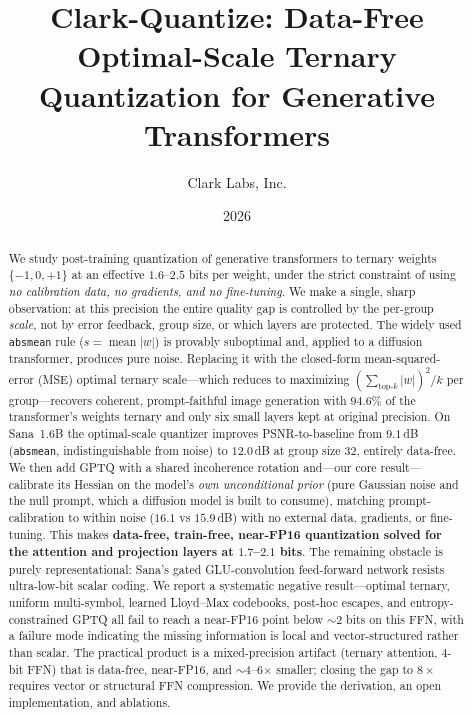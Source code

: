 \documentclass[11pt]{article}
\title{\textbf{Clark-Quantize: Data-Free Optimal-Scale Ternary\\
Quantization for Generative Transformers}}
\author{Clark Labs, Inc.}
\date{2026}
\begin{document}
\maketitle

\begin{abstract}
We study post-training quantization of generative transformers to ternary
weights $\{-1,0,+1\}$ at an effective $1.6$--$2.5$ bits per weight, under the
strict constraint of using \emph{no calibration data, no gradients, and no
fine-tuning}. We make a single, sharp observation: at this precision the entire
quality gap is controlled by the per-group \emph{scale}, not by error feedback,
group size, or which layers are protected. The widely used \texttt{absmean} rule
($s=\operatorname{mean}|w|$) is provably suboptimal and, applied to a diffusion
transformer, produces pure noise. Replacing it with the closed-form
mean-squared-error (MSE) optimal ternary scale---which reduces to maximizing
$(\sum_{\text{top-}k}|w|)^2/k$ per group---recovers coherent, prompt-faithful
image generation with $94.6\%$ of the transformer's weights ternary and only six
small layers kept at original precision. On Sana~1.6B the optimal-scale quantizer
improves PSNR-to-baseline from $9.1$\,dB (\texttt{absmean}, indistinguishable from
noise) to $12.0$\,dB at group size $32$, entirely data-free. We then add GPTQ with
a shared incoherence rotation and---our core result---calibrate its Hessian on the
model's \emph{own unconditional prior} (pure Gaussian noise and the null prompt,
which a diffusion model is built to consume), matching prompt-calibration to within
noise ($16.1$ vs $15.9$\,dB) with no external data, gradients, or fine-tuning. This
makes \textbf{data-free, train-free, near-FP16 quantization solved for the attention
and projection layers at $1.7$--$2.1$ bits}. The remaining obstacle is purely
representational: Sana's gated GLU-convolution feed-forward network resists
ultra-low-bit scalar coding. We report a systematic negative result---optimal
ternary, uniform multi-symbol, learned Lloyd--Max codebooks, post-hoc escapes, and
entropy-constrained GPTQ all fail to reach a near-FP16 point below $\sim$2 bits on
this FFN, with a failure mode indicating the missing information is local and
vector-structured rather than scalar. The practical product is a mixed-precision
artifact (ternary attention, $4$-bit FFN) that is data-free, near-FP16, and
$\sim$4--6$\times$ smaller; closing the gap to $8\times$ requires vector or
structural FFN compression. We provide the derivation, an open implementation, and
ablations.
\end{abstract}
\end{document}
